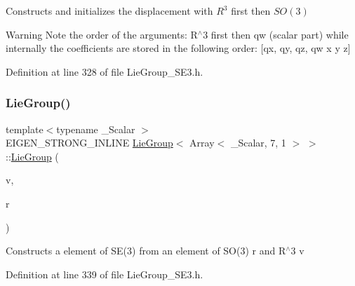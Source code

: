 Constructs and initializes the displacement with $R^3$ first then $SO(3)$

\begin{DoxyWarning}{Warning}
Note the order of the arguments\+: R$^\wedge$3 first then {\ttfamily qw} (scalar part) while internally the coefficients are stored in the following order\+: \mbox{[}{\ttfamily qx}, {\ttfamily qy}, {\ttfamily qz}, {\ttfamily qw} {\ttfamily x} {\ttfamily y} {\ttfamily z}\mbox{]} 
\end{DoxyWarning}


Definition at line 328 of file Lie\+Group\+\_\+\+S\+E3.\+h.

\hypertarget{class_lie_group_3_01_array_3_01___scalar_00_017_00_011_01_4_01_4_aca6a6a912e91782e43634a03f3eeb1ac}{}\label{class_lie_group_3_01_array_3_01___scalar_00_017_00_011_01_4_01_4_aca6a6a912e91782e43634a03f3eeb1ac} 
\subsubsection{\texorpdfstring{Lie\+Group()}{LieGroup()}\hspace{0.1cm}{\footnotesize\ttfamily [5/6]}}
{\footnotesize\ttfamily template$<$typename \+\_\+\+Scalar $>$ \\
E\+I\+G\+E\+N\+\_\+\+S\+T\+R\+O\+N\+G\+\_\+\+I\+N\+L\+I\+NE \hyperlink{class_lie_group}{Lie\+Group}$<$ Array$<$ \+\_\+\+Scalar, 7, 1 $>$ $>$\+::\hyperlink{class_lie_group}{Lie\+Group} (\begin{DoxyParamCaption}\item[{const typename Base\+::\+Vector3 \&}]{v,  }\item[{const typename Base\+::\+S\+O3\+Element \&}]{r }\end{DoxyParamCaption})\hspace{0.3cm}{\ttfamily [inline]}}

Constructs a element of S\+E(3) from an element of S\+O(3) {\ttfamily r} and R$^\wedge$3 {\ttfamily v} 

Definition at line 339 of file Lie\+Group\+\_\+\+S\+E3.\+h.

\hypertarget{class_lie_group_3_01_array_3_01___scalar_00_017_00_011_01_4_01_4_a97bbc79b1dfc73b9fd35f79c0bcfc3c4}{}\label{class_lie_group_3_01_array_3_01___scalar_00_017_00_011_01_4_01_4_a97bbc79b1dfc73b9fd35f79c0bcfc3c4} 
